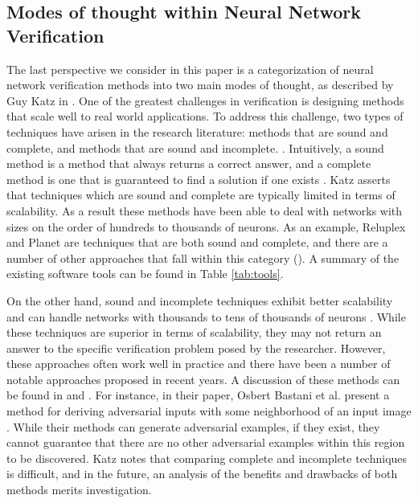 \documentclass[10pt,conference]{IEEEtran}
\begin{document}
\subsection{Modes of thought within Neural Network Verification}
The last perspective we consider in this paper is a categorization of neural network verification methods into two main modes of thought, as described by Guy Katz in \cite{KatzReluplex2017}. One of the greatest challenges in verification is designing methods that scale well to real world applications. To address this challenge, two types of techniques have arisen in the research literature: methods that are sound and complete, and methods that are sound and incomplete. \cite{KatzLecture_2018}. Intuitively, a sound method is a method that always returns a correct answer, and a complete method is one that is guaranteed to find a solution if one exists \cite{KatzLecture_2018}. Katz asserts that techniques which are sound and complete are typically limited in terms of scalability. As a result  these methods have been able to deal with networks with sizes on the order of hundreds to thousands of neurons. As an example, Reluplex and Planet are techniques that are both sound and complete, and there are a number of other approaches that fall within this category (\cite{TjengMixedIntegerPogramming,XiangVerification2018,DuttaOutputRange2017,LomuscioReachability2017}). A summary of the existing software tools can be found in Table \ref{tab:tools}.

On the other hand, sound and incomplete techniques exhibit better scalability and can handle networks with thousands to tens of thousands of neurons \cite{KatzReluplex2017}. While these techniques are superior in terms of scalability, they may not return an answer to the specific verification problem posed by the researcher. However, these approaches often work well in practice and there have been a number of notable approaches proposed in recent years. A discussion of these methods can be found in \cite{HuangSafetyVerification2016} and \cite{ XiangVerification2018}. For instance, in their paper, Osbert Bastani et al. present a method for deriving adversarial inputs with some neighborhood of an input image \cite{BastaniMeasuring2018}. While their methods can generate adversarial examples, if they exist, they cannot guarantee that there are no other adversarial examples within this region to be discovered. Katz notes that comparing complete and incomplete techniques is difficult, and in the future, an analysis of the benefits and drawbacks of both methods merits investigation.
\end{document}
